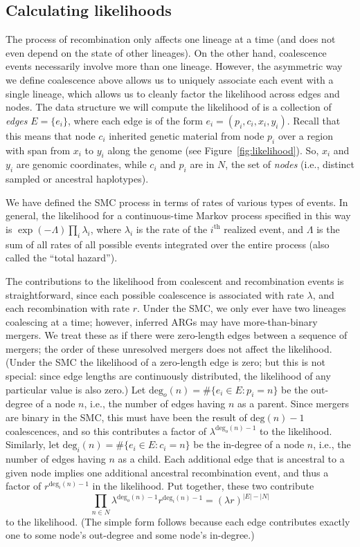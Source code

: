 \documentclass{article}
\renewcommand{\deg}{\mathrm{deg}}
\begin{document}
\subsection{Calculating likelihoods} \label{par:liks}

The process of recombination only affects one lineage at a time
(and does not even depend on the state of other lineages).
On the other hand, coalescence events necessarily involve more than one lineage.
However, the asymmetric way we define coalescence above
allows us to uniquely associate each event with a single lineage,
which allows us to cleanly factor the likelihood across edges and nodes.
The data structure we will compute the likelihood of
is a collection of \emph{edges} $E=\{e_i\}$,
where each edge is of the form $e_i = (p_i,c_i,x_i,y_i)$.
Recall that this means that node $c_i$ inherited genetic material from node $p_i$
over a region with span from $x_i$ to $y_i$ along the genome
(see Figure~\ref{fig:likelihood}).
So, $x_i$ and $y_i$ are genomic coordinates,
while $c_i$ and $p_i$ are in $N$, the set of \emph{nodes}
(i.e., distinct sampled or ancestral haplotypes).

We have defined the SMC process in terms of rates of various types of events.
In general, the likelihood for a continuous-time Markov process specified in this way
is $\exp(-\Lambda) \prod_i \lambda_i$,
where $\lambda_i$ is the rate of the $i^\text{th}$ realized event,
and $\Lambda$ is the sum of all rates of all possible events
integrated over the entire process
(also called the ``total hazard'').

The contributions to the likelihood from coalescent and recombination events
is straightforward, since each possible coalescence is associated with rate $\lambda$,
and each recombination with rate $r$.
Under the SMC, we only ever have two lineages coalescing at a time;
however, inferred ARGs may have more-than-binary mergers.
We treat these as if there were zero-length edges
between a sequence of mergers;
the order of these unresolved mergers does not affect the likelihood.
(Under the SMC the likelihood of a zero-length edge is zero;
but this is not special: since edge lengths are continuously distributed,
the likelihood of any particular value is also zero.)
Let $\deg_o(n) = \#\{e_i \in E : p_i=n\}$ be the out-degree of a node $n$,
i.e., the number of edges having $n$ as a parent.
Since mergers are binary in the SMC,
this must have been the result of $\deg(n) - 1$ coalescences,
and so this contributes a factor of $\lambda^{\deg_o(n)-1}$ to the likelihood.
Similarly,
let $\deg_i(n) = \#\{e_i \in E : c_i=n\}$ be the in-degree of a node $n$,
i.e., the number of edges having $n$ as a child.
Each additional edge that is ancestral to a given node
implies one additional ancestral recombination event,
and thus a factor of  $r^{\deg_i(n)-1}$ in the likelihood.
Put together, these two contribute
\begin{equation}\label{eq:coal}
    \prod_{n \in N} \lambda^{\deg_o(n)-1} r^{\deg_i(n)-1}  
    =
    (\lambda r)^{|E|-|N|} 
\end{equation}
to the likelihood.
(The simple form follows because each edge contributes exactly one
to some node's out-degree and some node's in-degree.)
\end{document}
